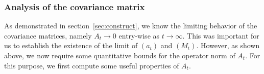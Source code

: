 
\subsubsection{Analysis of the covariance matrix}

As demonstrated in section~\ref{sec:construct}, we know the limiting behavior of the covariance matrices, namely 
\(A_t \to 0\) entry-wise as \(t \to \infty\). This was important for us to establish the existence of the limit 
of \((a_t)\) and \((M_t)\). However, as shown above, we now require some quantitative bounds for the operator 
norm of \(A_t\). For this purpose, we first compute some useful properties of \(A_t\).

